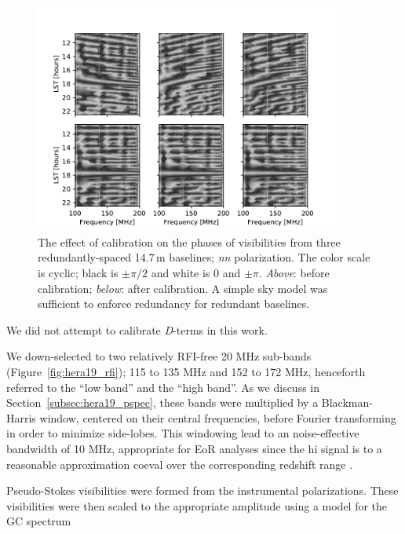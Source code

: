 \begin{figure}
\centering
\includegraphics[width=0.9\textwidth]{chapters/eor_window_HERA/figures/phases_pre_post_abscal_h19_cyclic_grey.pdf}
\caption[The effect of calibration on the phases of visibilities from three redundantly-spaced 14.7\,m baselines.]{The effect of calibration on the phases of visibilities from three redundantly-spaced 14.7\,m baselines; \textit{nn} polarization. The color scale is cyclic; black is $\pm\pi/2$ and white is 0 and $\pm\pi$. \textit{Above}: before calibration; \textit{below}: after calibration. A simple sky model was sufficient to enforce redundancy for redundant baselines.}
\label{fig:hera19_phasecal}
\end{figure}

We did not attempt to calibrate \textit{D}-terms in this work.

We down-selected to two relatively RFI-free 20 MHz sub-bands (Figure~\ref{fig:hera19_rfi}); 115 to 135 MHz and 152 to 172 MHz, henceforth referred to the ``low band'' and the ``high band''. As we discuss in Section~\ref{subsec:hera19_pspec}, these bands were multiplied by a Blackman-Harris window, centered on their central frequencies, before Fourier transforming in order to minimize side-lobes. This windowing lead to an noise-effective bandwidth of 10 MHz, appropriate for EoR analyses since the {\sc hi} signal is to a reasonable approximation coeval over the corresponding redshift range \citep{Furlanetto.06}.

Pseudo-Stokes visibilities were formed from the instrumental polarizations. These visibilities were then scaled to the appropriate amplitude using a model for the GC spectrum 

